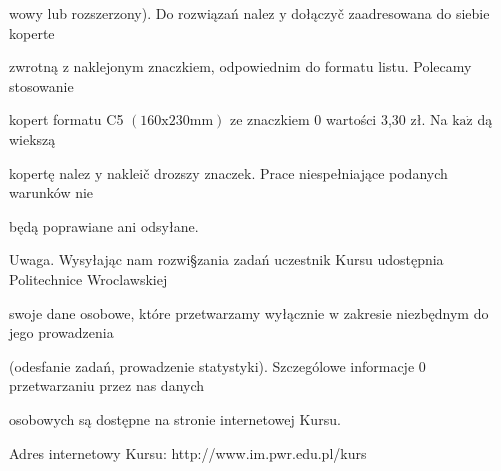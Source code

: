 \documentclass[a4paper,12pt]{article}
\begin{document}
wowy lub rozszerzony). Do rozwiązań nalez $\mathrm{y}$ dołączyč zaadresowana do siebie koperte

zwrotną $\mathrm{z}$ naklejonym znaczkiem, odpowiednim do formatu listu. Polecamy stosowanie

kopert formatu C5 $(160\mathrm{x}230\mathrm{m}\mathrm{m})$ ze znaczkiem $0$ wartości 3,30 zł. Na $\mathrm{k}\mathrm{a}\dot{\mathrm{z}}$ dą wiekszą

kopertę nalez $\mathrm{y}$ nakleič drozszy znaczek. Prace niespełniające podanych warunków nie

będą poprawiane ani odsyłane.

Uwaga. Wysyłając nam rozwi\S zania zadań uczestnik Kursu udostępnia Politechnice Wroclawskiej

swoje dane osobowe, które przetwarzamy wyłącznie $\mathrm{w}$ zakresie niezbędnym do jego prowadzenia

(odesfanie zadań, prowadzenie statystyki). Szczególowe informacje $0$ przetwarzaniu przez nas danych

osobowych są dostępne na stronie internetowej Kursu.

Adres internetowy Kursu: http://www.im.pwr.edu.pl/kurs
\end{document}
